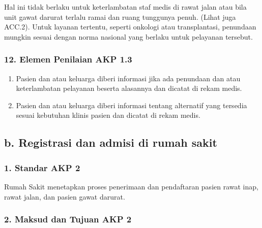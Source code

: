 \documentclass[
]{book}
\providecommand{\tightlist}{%
  \setlength{\itemsep}{0pt}\setlength{\parskip}{0pt}}
\begin{document}
Hal ini tidak berlaku untuk keterlambatan staf medis di rawat jalan atau bila unit gawat darurat terlalu ramai dan ruang tunggunya penuh. (Lihat juga ACC.2). Untuk layanan tertentu, seperti onkologi atau transplantasi, penundaan mungkin sesuai dengan norma nasional yang berlaku untuk pelayanan tersebut.

\hypertarget{elemen-penilaian-akp-1.3}{%
\subsubsection*{12. Elemen Penilaian AKP 1.3}\label{elemen-penilaian-akp-1.3}}

\begin{enumerate}
\def\labelenumi{\alph{enumi}.}
\tightlist
\item
  Pasien dan atau keluarga diberi informasi jika ada penundaan dan atau keterlambatan pelayanan beserta alasannya dan dicatat di rekam medis.
\item
  Pasien dan atau keluarga diberi informasi tentang alternatif yang tersedia sesuai kebutuhan klinis pasien dan dicatat di rekam medis.
\end{enumerate}

\hypertarget{b.-registrasi-dan-admisi-di-rumah-sakit}{%
\subsection*{b. Registrasi dan admisi di rumah sakit}\label{b.-registrasi-dan-admisi-di-rumah-sakit}}

\hypertarget{standar-akp-2}{%
\subsubsection*{1. Standar AKP 2}\label{standar-akp-2}}

Rumah Sakit menetapkan proses penerimaan dan pendaftaran pasien rawat inap, rawat jalan, dan pasien gawat darurat.

\hypertarget{maksud-dan-tujuan-akp-2}{%
\subsubsection*{2. Maksud dan Tujuan AKP 2}\label{maksud-dan-tujuan-akp-2}}
\end{document}
